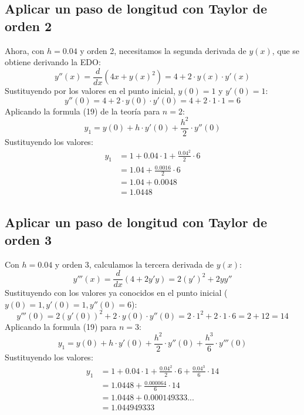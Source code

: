 \documentclass{article}
\begin{document}
\subsection{Aplicar un paso de longitud con Taylor de orden 2}

Ahora, con $h=0.04$ y orden 2, necesitamos la segunda derivada de $y(x)$, que se obtiene derivando la EDO:
\begin{equation}
y''(x) = \frac{d}{dx}(4x + y(x)^2) = 4 + 2 \cdot y(x) \cdot y'(x)
\end{equation}
Sustituyendo por los valores en el punto inicial, $y(0)=1$ y $y'(0)=1$:
\begin{equation}
y''(0) = 4 + 2 \cdot y(0) \cdot y'(0) = 4 + 2 \cdot 1 \cdot 1 = 6
\end{equation}
Aplicando la formula (19) de la teoría para $n=2$:
\begin{equation}
y_1 = y(0) + h \cdot y'(0) + \frac{h^2}{2} \cdot y''(0)
\end{equation}
Sustituyendo los valores:
\begin{align*}
y_1 &= 1 + 0.04 \cdot 1 + \frac{0.04^2}{2} \cdot 6 \\
&= 1.04 + \frac{0.0016}{2} \cdot 6 \\
&= 1.04 + 0.0048 \\
&= \boxed{1.0448}
\end{align*}

\subsection{Aplicar un paso de longitud con Taylor de orden 3}

Con $h=0.04$ y orden 3, calculamos la tercera derivada de $y(x)$:
\begin{equation}
y'''(x) = \frac{d}{dx}(4 + 2y'y) = 2(y')^2 + 2yy''
\end{equation}
Sustituyendo con los valores ya conocidos en el punto inicial ($y(0)=1, y'(0)=1, y''(0)=6$):
\begin{equation}
y'''(0) = 2(y'(0))^2 + 2 \cdot y(0) \cdot y''(0) = 2 \cdot 1^2 + 2 \cdot 1 \cdot 6 = 2 + 12 = 14
\end{equation}
Aplicando la formula (19) para $n=3$:
\begin{equation}
y_1 = y(0) + h \cdot y'(0) + \frac{h^2}{2} \cdot y''(0) + \frac{h^3}{6} \cdot y'''(0)
\end{equation}
Sustituyendo los valores:
\begin{align*}
y_1 &= 1 + 0.04 \cdot 1 + \frac{0.04^2}{2} \cdot 6 + \frac{0.04^3}{6} \cdot 14 \\
&= 1.0448 + \frac{0.000064}{6} \cdot 14 \\
&= 1.0448 + 0.000149333... \\
&= \boxed{1.044949333}
\end{align*}
\end{document}
